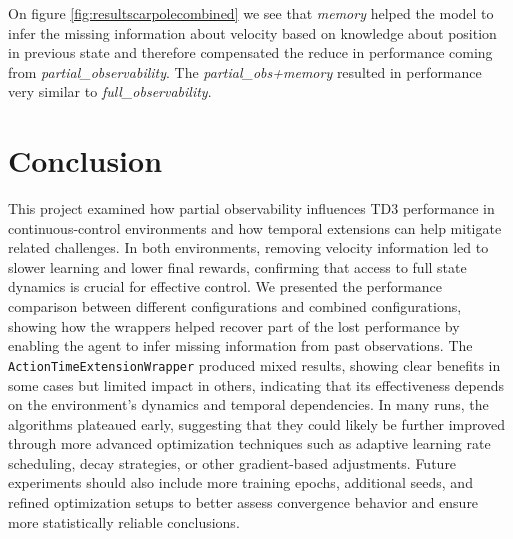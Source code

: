 \documentclass[12pt, a4paper]{article}
\begin{document}
On figure  \ref{fig:resultscarpolecombined} we see that \textit{memory} helped the model to infer the missing information about velocity based on knowledge about position in previous state and therefore compensated the reduce in performance coming from \textit{partial\_observability}. The \textit{partial\_obs+memory} resulted in performance very similar to \textit{full\_observability}.



\section{Conclusion}

This project examined how partial observability influences TD3 performance in continuous-control environments and how temporal extensions can help mitigate related challenges. In both environments, removing velocity information led to slower learning and lower final rewards, confirming that access to full state dynamics is crucial for effective control. We presented the performance comparison between different configurations and combined configurations, showing how the wrappers helped recover part of the lost performance by enabling the agent to infer missing information from past observations. The \texttt{ActionTimeExtensionWrapper} produced mixed results, showing clear benefits in some cases but limited impact in others, indicating that its effectiveness depends on the environment’s dynamics and temporal dependencies. In many runs, the algorithms plateaued early, suggesting that they could likely be further improved through more advanced optimization techniques such as adaptive learning rate scheduling, decay strategies, or other gradient-based adjustments. Future experiments should also include more training epochs, additional seeds, and refined optimization setups to better assess convergence behavior and ensure more statistically reliable conclusions.
\end{document}

